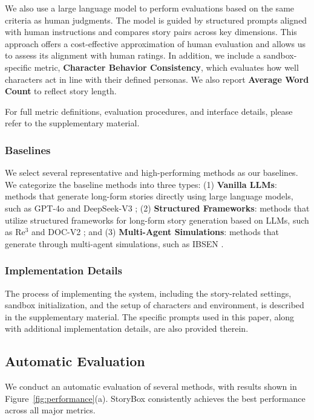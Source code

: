 \documentclass[letterpaper]{article} %
\begin{document}
We also use a large language model to perform evaluations based on the same criteria as human judgments. The model is guided by structured prompts aligned with human instructions and compares story pairs across key dimensions. This approach offers a cost-effective approximation of human evaluation and allows us to assess its alignment with human ratings. In addition, we include a sandbox-specific metric, \textbf{Character Behavior Consistency}, which evaluates how well characters act in line with their defined personas. We also report \textbf{Average Word Count} to reflect story length.

For full metric definitions, evaluation procedures, and interface details, please refer to the supplementary material.

\subsubsection{Baselines}

We select several representative and high-performing methods as our baselines. We categorize the baseline methods into three types: (1) \textbf{Vanilla LLMs}: methods that generate long-form stories directly using large language models, such as GPT-4o \cite{hurst2024gpt} and DeepSeek-V3 \cite{liu2024deepseek}; (2) \textbf{Structured Frameworks}: methods that utilize structured frameworks for long-form story generation based on LLMs, such as Re$^3$ \cite{yang-etal-2022-re3} and DOC-V2 \cite{yang-etal-2023-doc}; and (3) \textbf{Multi-Agent Simulations}: methods that generate through multi-agent simulations, such as IBSEN \cite{han-etal-2024-ibsen}.

\subsubsection{Implementation Details}

The process of implementing the system, including the story-related settings, sandbox initialization, and the setup of characters and environment, is described in the supplementary material. The specific prompts used in this paper, along with additional implementation details, are also provided therein.

\subsection{Automatic Evaluation}

We conduct an automatic evaluation of several methods, with results shown in Figure~\ref{fig:performance}(a). StoryBox consistently achieves the best performance across all major metrics.
\end{document}

